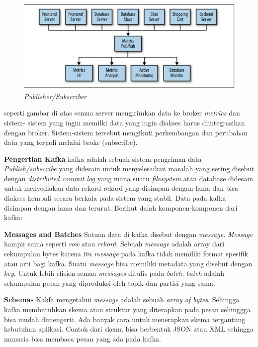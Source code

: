 \documentclass[a4paper,twoside]{article}
\begin{document}
\begin{enumerate}
		\begin{figure}[H] 
		\centering  
		\includegraphics[scale=1]{pubsub}  
		\caption[Gambar Publisher/Subscriber]{\textit{Publisher/Subscriber}} 
		\label{fig:pub-sub} 
		\end{figure}

		seperti gambar di atas semua server mengirimkan data ke broker \textit{metrics} dan sistem-				sistem yang ingin memilki data yang ingin diakses harus diintegrasikan dengan broker. 					Sistem-sistem tersebut mengikuti perkembangan dan perubahan data yang terjadi melalui broke 			(subscribe).
		
		\textbf{Pengertian Kafka} \newline
		kafka adalah sebuah sistem pengriman data \textit{Publish/subscribe} yang didesain untuk 				menyelesaikan masalah yang sering disebut dengan \textit{distributed commit log} yang mana 				suatu \textit{filesystem} atau database didesain untuk menyediakan data rekord-rekord yang 				disimpan dengan lama dan bisa diakses kembali secara berkala pada sistem yang stabil. Data 				pada kafka disimpan dengan lama dan terurut. Berikut dalah komponen-komponen dari kafka:
		
		\textbf{Messages and Batches} \newline
		Satuan data di kafka disebut dengan \textit{message}. \textit{Message} hampir sama seperti 				\textit{row} atau \textit{rekord}. Sebuah \textit{message} adalah array dari sekumpulan 				bytes karena itu \textit{message} pada kafka tidak memiliki format spesifik atau arti bagi 				kafka. Suatu \textit{message} bisa memiliki metadata yang disebut dengan \textit{key}. Untuk 		lebih efisien semua \textit{messages} ditulis pada \textit{batch}. \textit{batch} adalah 				sekumpulan pesan yang diproduksi oleh topik dan partisi yang sama.
		
		\textbf{Schemas}\newline
		Kakfa mengetahui \textit{message} adalah sebuah \textit{array of bytes}. Sehingga kafka 				membutuhkan skema atau struktur yang diterapkan pada pesan sehinggga bisa mudah dimengerti. 			Ada banyak cara untuk menerapkan skema tergantung kebutuhan aplikasi. Contoh dari skema bisa 		berbentuk JSON atau XML sehingga manusia bisa membaca pesan yang ada pada kafka.
		

\end{enumerate}
\end{document}

